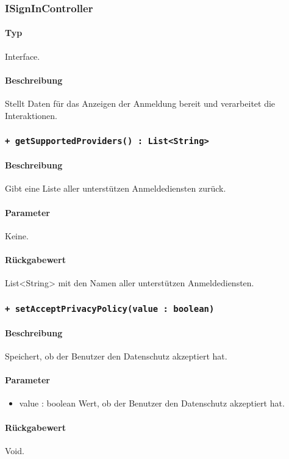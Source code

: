 \subsubsection{ISignInController}
\paragraph*{Typ}
Interface.
\paragraph*{Beschreibung}
Stellt Daten für das Anzeigen der Anmeldung bereit und verarbeitet die Interaktionen.

\subsubsection{\texttt{+ getSupportedProviders() : List<String>}}%
\paragraph*{Beschreibung}
Gibt eine Liste aller unterstützen Anmeldediensten zurück.
\paragraph*{Parameter}
Keine.
\paragraph*{Rückgabewert}
List<String> mit den Namen aller unterstützen Anmeldediensten.

\subsubsection{\texttt{+ setAcceptPrivacyPolicy(value : boolean)}}%
\paragraph*{Beschreibung}
Speichert, ob der Benutzer den Datenschutz akzeptiert hat.
\paragraph*{Parameter}
\begin{itemize}
    \item value : boolean Wert, ob der Benutzer den Datenschutz akzeptiert hat.
\end{itemize}
\paragraph*{Rückgabewert}
Void.


